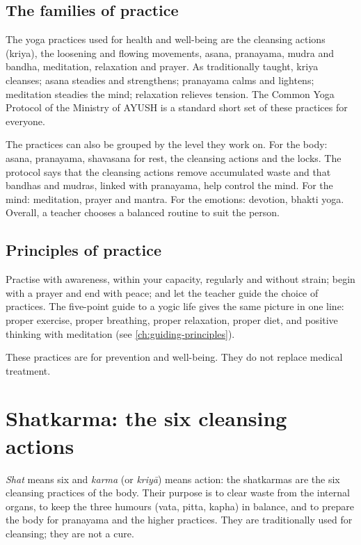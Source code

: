 \subsection*{The families of practice}
The yoga practices used for health and well-being are the cleansing actions (kriya), the loosening and flowing movements, asana, pranayama, mudra and bandha, meditation, relaxation and prayer. As traditionally taught, kriya cleanses; asana steadies and strengthens; pranayama calms and lightens; meditation steadies the mind; relaxation relieves tension. The Common Yoga Protocol of the Ministry of AYUSH is a standard short set of these practices for everyone.

The practices can also be grouped by the level they work on. For the body: asana, pranayama, shavasana for rest, the cleansing actions and the locks. The protocol says that the cleansing actions remove accumulated waste and that bandhas and mudras, linked with pranayama, help control the mind. For the mind: meditation, prayer and mantra. For the emotions: devotion, bhakti yoga. Overall, a teacher chooses a balanced routine to suit the person.

\subsection*{Principles of practice}
Practise with awareness, within your capacity, regularly and without strain; begin with a prayer and end with peace; and let the teacher guide the choice of practices. The five-point guide to a yogic life gives the same picture in one line: proper exercise, proper breathing, proper relaxation, proper diet, and positive thinking with meditation (see \cref{ch:guiding-principles}).

These practices are for prevention and well-being. They do not replace medical treatment.

\section{Shatkarma: the six cleansing actions}
\label{ch:shatkarma-intro}

\emph{Shat} means six and \emph{karma} (or \emph{kriyā}) means action: the shatkarmas are the six cleansing practices of the body. Their purpose is to clear waste from the internal organs, to keep the three humours (vata, pitta, kapha) in balance, and to prepare the body for pranayama and the higher practices. They are traditionally used for cleansing; they are not a cure.

